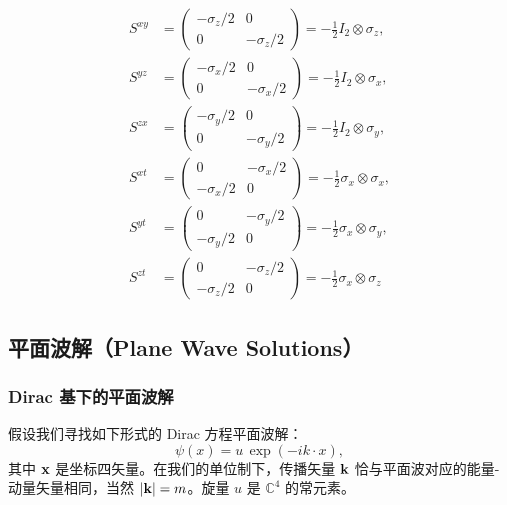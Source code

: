 \begin{align}
S^{xy} &=
\begin{pmatrix}-\sigma_{z}/2&0\\ 0&-\sigma_{z}/2\end{pmatrix}
=-\tfrac12 I_{2}\otimes\sigma_{z}, \nonumber\\
S^{yz} &=
\begin{pmatrix}-\sigma_{x}/2&0\\ 0&-\sigma_{x}/2\end{pmatrix}
=-\tfrac12 I_{2}\otimes\sigma_{x}, \nonumber\\
S^{zx} &=
\begin{pmatrix}-\sigma_{y}/2&0\\ 0&-\sigma_{y}/2\end{pmatrix}
=-\tfrac12 I_{2}\otimes\sigma_{y}, \nonumber\\
S^{xt} &=
\begin{pmatrix}0&-\sigma_{x}/2\\ -\sigma_{x}/2&0\end{pmatrix}
=-\tfrac12\sigma_{x}\otimes\sigma_{x}, \nonumber\\
S^{yt} &=
\begin{pmatrix}0&-\sigma_{y}/2\\ -\sigma_{y}/2&0\end{pmatrix}
=-\tfrac12\sigma_{x}\otimes\sigma_{y}, \nonumber\\
S^{zt} &=
\begin{pmatrix}0&-\sigma_{z}/2\\ -\sigma_{z}/2&0\end{pmatrix}
=-\tfrac12\sigma_{x}\otimes\sigma_{z}
\tag{Riemannian}
\end{align}

\subsection{平面波解（Plane Wave Solutions）}

\subsubsection{Dirac 基下的平面波解}

假设我们寻找如下形式的 Dirac 方程平面波解：
\begin{equation}
\psi(x)=u\,\exp(-ik\cdot x),
\end{equation}
其中 $\mathbf{x}$ 是坐标四矢量。在我们的单位制下，传播矢量 $\mathbf{k}$ 恰与平面波对应的能量-动量矢量相同，当然 $|\mathbf{k}|=m$。旋量 $u$ 是 $\mathbb{C}^{4}$ 的常元素。

